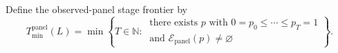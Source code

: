 Define the observed-panel stage frontier by
\[
 T_{\min}^{\mathrm{panel}}(L)
 =\min\left\{T\in\mathbb N:\ 
 \begin{array}{l}
 \text{there exists }p\text{ with }0=p_0\le\cdots\le p_T=1\\
 \text{and }\mathcal E_{\mathrm{panel}}(p)\ne\varnothing
 \end{array}
 \right\}.
\]